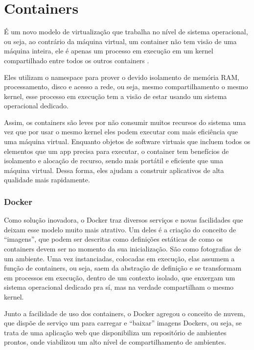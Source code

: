 \section{Containers}
    É um novo modelo de virtualização que trabalha no nível de sistema operacional,
    ou seja, ao contrário da máquina virtual, um container não tem visão de uma
    máquina inteira, ele é apenas um processo em execução em um kernel compartilhado
    entre todos os outros containers \cite{dua2014virtualization}.

    Eles utilizam o namespace para prover o devido isolamento de memória RAM,
    processamento, disco e acesso a rede, ou seja, mesmo compartilhamento o
    mesmo kernel, esse processo em execução tem a visão de estar usando um
    sistema operacional dedicado.

    Assim, os containers são leves por não consumir muitos recursos do
    sistema uma vez que por usar o mesmo kernel eles podem executar com
    mais eficiência que uma máquina virtual. Enquanto objetos de software
    virtuais que incluem todos os elementos que um app precisa para executar,
    o container tem benefícios de isolamento e alocação de recurso, sendo
    mais portátil e eficiente que uma máquina virtual. Dessa forma, eles
    ajudam a construir aplicativos de alta qualidade mais rapidamente.

    \subsubsection{Docker}
    Como solução inovadora, o Docker traz diversos serviços e novas
    facilidades que deixam esse modelo muito mais atrativo. Um deles
    é a criação do conceito de “imagens”, que podem ser descritas como
    definições estáticas de como os containers devem ser no momento da
    sua inicialização. São como fotografias de um ambiente. Uma vez
    instanciadas, colocadas em execução, elas assumem a função de
    containers, ou seja, saem da abstração de definição e se transformam
    em processos em execução, dentro de um contexto isolado, que
    enxergam um sistema operacional dedicado pra sí, mas na verdade
    compartilham o mesmo kernel.

    Junto a facilidade de uso dos containers, o Docker agregou o
    conceito de nuvem, que dispõe de serviço um para carregar e
    “baixar” imagens Dockers, ou seja, se trata de uma aplicação
    web que disponibiliza um repositório de ambientes prontos,
    onde viabilizou um alto nível de compartilhamento de ambientes.

